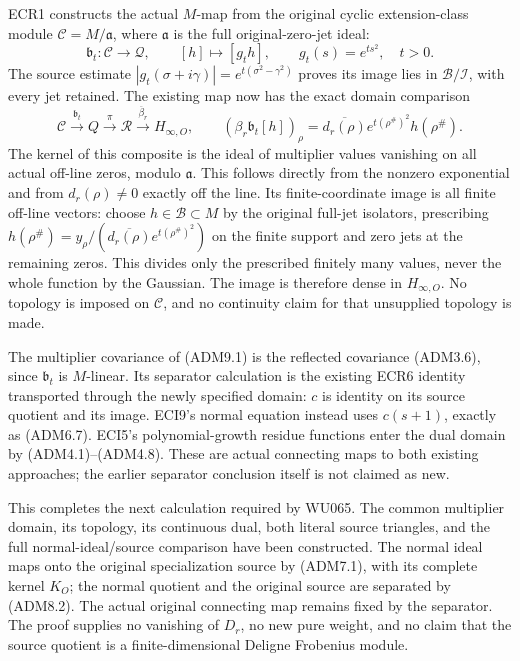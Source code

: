 ECR1 constructs the actual \(M\)-map from the original cyclic
extension-class module \(\mathscr C=M/\mathfrak a\), where
\(\mathfrak a\) is the full original-zero-jet ideal: \[
\mathfrak b_t:\mathscr C\to\mathcal Q,\qquad
[h]\mapsto[g_t h],\qquad g_t(s)=e^{ts^2},\quad t>0.
\] The source estimate
\(|g_t(\sigma+i\gamma)|=e^{t(\sigma^2-\gamma^2)}\) proves its image lies
in \(\mathcal B/\mathcal I\), with every jet retained. The existing map
now has the exact domain comparison \[
\mathscr C\xrightarrow{\mathfrak b_t}Q
\xrightarrow{\pi}\mathcal R
\xrightarrow{\overline\beta_r}H_{\infty,O},\qquad
(\beta_r\mathfrak b_t[h])_\rho
=\overline{d_r(\rho)}e^{t(\rho^\#)^2}h(\rho^\#).
\tag{ADM9.1}
\] The kernel of this composite is the ideal of multiplier values
vanishing on all actual off-line zeros, modulo \(\mathfrak a\). This
follows directly from the nonzero exponential and from \(d_r(\rho)\ne0\)
exactly off the line. Its finite-coordinate image is all finite off-line
vectors: choose \(h\in\mathcal B\subset M\) by the original full-jet
isolators, prescribing
\(h(\rho^\#)=y_\rho/(\overline{d_r(\rho)}e^{t(\rho^\#)^2})\) on the
finite support and zero jets at the remaining zeros. This divides only
the prescribed finitely many values, never the whole function by the
Gaussian. The image is therefore dense in \(H_{\infty,O}\). No topology
is imposed on \(\mathscr C\), and no continuity claim for that
unsupplied topology is made.

The multiplier covariance of (ADM9.1) is the reflected covariance
(ADM3.6), since \(\mathfrak b_t\) is \(M\)-linear. Its separator
calculation is the existing ECR6 identity transported through the newly
specified domain: \(c\) is identity on its source quotient and its
image. ECI9's normal equation instead uses \(c(s+1)\), exactly as
(ADM6.7). ECI5's polynomial-growth residue functions enter the dual
domain by (ADM4.1)--(ADM4.8). These are actual connecting maps to both
existing approaches; the earlier separator conclusion itself is not
claimed as new.

This completes the next calculation required by WU065. The common
multiplier domain, its topology, its continuous dual, both literal
source triangles, and the full normal-ideal/source comparison have been
constructed. The normal ideal maps onto the original specialization
source by (ADM7.1), with its complete kernel \(K_O\); the normal
quotient and the original source are separated by (ADM8.2). The actual
original connecting map remains fixed by the separator. The proof
supplies no vanishing of \(D_r\), no new pure weight, and no claim that
the source quotient is a finite-dimensional Deligne Frobenius module.

